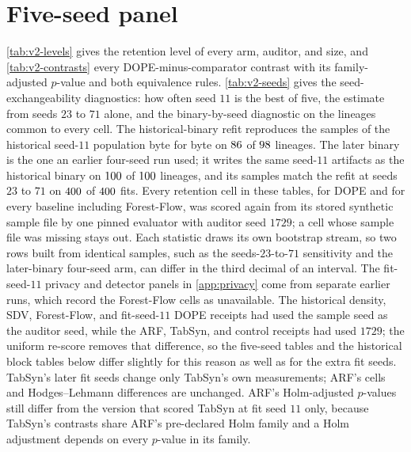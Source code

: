 \documentclass{article}
\begin{document}
\section{Five-seed panel}
\label{app:v2}
\cref{tab:v2-levels} gives the retention level of every arm, auditor, and size, and \cref{tab:v2-contrasts} every DOPE-minus-comparator contrast with its family-adjusted $p$-value and both equivalence rules. \cref{tab:v2-seeds} gives the seed-exchangeability diagnostics: how often seed $11$ is the best of five, the estimate from seeds $23$ to $71$ alone, and the binary-by-seed diagnostic on the lineages common to every cell. The historical-binary refit reproduces the samples of the historical seed-$11$ population byte for byte on $86$ of $98$ lineages. The later binary is the one an earlier four-seed run used; it writes the same seed-$11$ artifacts as the historical binary on $100$ of $100$ lineages, and its samples match the refit at seeds $23$ to $71$ on $400$ of $400$ fits. Every retention cell in these tables, for DOPE and for every baseline including Forest-Flow, was scored again from its stored synthetic sample file by one pinned evaluator with auditor seed $1729$; a cell whose sample file was missing stays out. Each statistic draws its own bootstrap stream, so two rows built from identical samples, such as the seeds-$23$-to-$71$ sensitivity and the later-binary four-seed arm, can differ in the third decimal of an interval. The fit-seed-$11$ privacy and detector panels in \cref{app:privacy} come from separate earlier runs, which record the Forest-Flow cells as unavailable. The historical density, SDV, Forest-Flow, and fit-seed-$11$ DOPE receipts had used the sample seed as the auditor seed, while the ARF, TabSyn, and control receipts had used $1729$; the uniform re-score removes that difference, so the five-seed tables and the historical block tables below differ slightly for this reason as well as for the extra fit seeds. TabSyn's later fit seeds change only TabSyn's own measurements; ARF's cells and Hodges--Lehmann differences are unchanged. ARF's Holm-adjusted $p$-values still differ from the version that scored TabSyn at fit seed $11$ only, because TabSyn's contrasts share ARF's pre-declared Holm family and a Holm adjustment depends on every $p$-value in its family.

{\scriptsize\setlength{\tabcolsep}{2pt}

\newpage
}

\begin{table}[t]
\caption{\textbf{Seed exchangeability and the binary-by-seed diagnostic, CatBoost.} The count of lineages where seed $11$ is the best of five is descriptive: a seed acts on every lineage at once, so the lineages are not independent trials and no $p$-value is given. The 2$\times$2 cells are medians on the lineages common to all cells, with the median on each cell's own lineages beside it. No Holm family.}
\label{tab:v2-seeds}
\centering
\footnotesize

\end{table}
\end{document}
